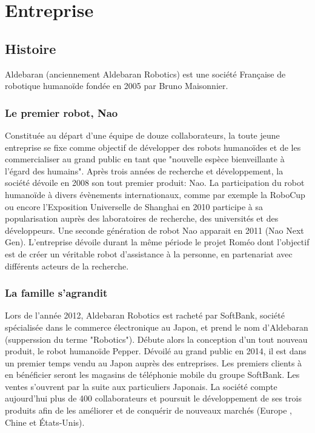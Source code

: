 \chapter{Entreprise}
\label{Entreprise}
\thispagestyle{fancy}

\section{Histoire}
\label{Entreprise: histoire}
Aldebaran (anciennement Aldebaran Robotics) est une société Française de robotique humanoïde fondée en 2005 par Bruno Maisonnier. 

\subsection{Le premier robot, Nao}
\label{Entreprise:Histoire:Nao}
Constituée au départ d'une équipe de douze collaborateurs, la toute jeune entreprise se fixe comme objectif de développer des robots humanoïdes et de les commercialiser au grand public en tant que "nouvelle espèce bienveillante à l'égard des humains". Après trois années de recherche et développement, la société dévoile en 2008 son tout premier produit: Nao. La participation du robot humanoïde à divers évènements internationaux, comme par exemple la RoboCup ou encore l'Exposition Universelle de Shanghai en 2010 participe à sa popularisation auprès des laboratoires de recherche, des universités et des développeurs. Une seconde génération de robot Nao apparait en 2011 (Nao Next Gen). L'entreprise dévoile durant la même période le projet Roméo dont l'objectif est de créer un véritable robot d'assistance à la personne, en partenariat avec différents acteurs de la recherche. 

\subsection{La famille s'agrandit}
\label{Entreprise: La famille Aldebaran}
Lors de l'année 2012, Aldebaran Robotics est racheté par SoftBank, société spécialisée dans le commerce électronique au Japon, et prend le nom d'Aldebaran (supperssion du terme "Robotics"). Débute alors la conception d'un tout nouveau produit, le robot humanoïde Pepper. Dévoilé au grand public en 2014, il est dans un premier temps vendu au Japon auprès des entreprises. Les premiers clients à en bénéficier seront les magasins de téléphonie mobile du groupe SoftBank. Les ventes s'ouvrent par la suite aux particuliers Japonais. La société compte aujourd'hui plus de 400 collaborateurs et poursuit le développement de ses trois produits afin de les améliorer et de conquérir de nouveaux marchés (Europe , Chine et États-Unis).

